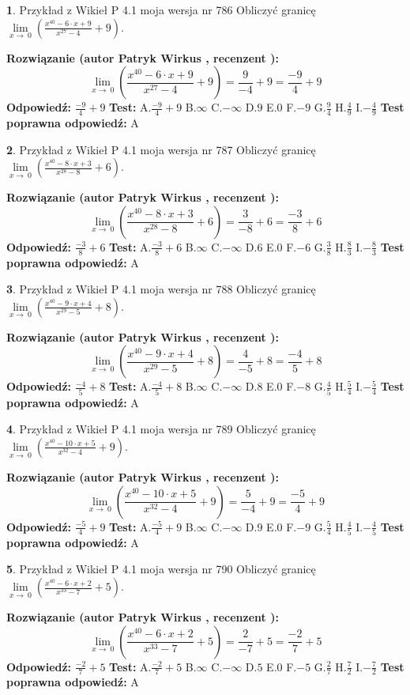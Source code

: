 \documentclass[12pt, a4paper]{article}
\theoremstyle{definition} %
\newtheorem{zad}{}
\newcommand{\zadStart}[1]{\begin{zad}#1\newline}
\newcommand{\zadStop}{\end{zad}}
\newcommand{\rozwStart}[2]{\noindent \textbf{Rozwiązanie (autor #1 , recenzent #2): }\newline}
\newcommand{\rozwStop}{\newline}
\newcommand{\odpStart}{\noindent \textbf{Odpowiedź:}\newline}
\newcommand{\odpStop}{\newline}
\newcommand{\testStart}{\noindent \textbf{Test:}\newline}
\newcommand{\testStop}{\newline}
\newcommand{\kluczStart}{\noindent \textbf{Test poprawna odpowiedź:}\newline}
\newcommand{\kluczStop}{\newline}
\begin{document}
\zadStart{Przykład z Wikieł P 4.1 moja wersja nr 786}
Obliczyć granicę $\lim\limits_{x\to\ 0}(\frac{x^{40}-6 \cdot x +9}{x^{27}-4}+9)$.
\zadStop
\rozwStart{Patryk Wirkus}{}
$$\lim\limits_{x\to\ 0}(\frac{x^{40}-6 \cdot x +9}{x^{27}-4}+9)=\frac{9}{-4}+9=\frac{-9}{4}+9$$
\rozwStop
\odpStart
$\frac{-9}{4}+9$
\odpStop
\testStart
A.$\frac{-9}{4}+9$
B.$\infty$
C.$-\infty$
D.$9$
E.$0$
F.$-9$
G.$\frac{9}{4}$
H.$\frac{4}{9}$
I.$-\frac{4}{9}$
\testStop
\kluczStart
A
\kluczStop



\zadStart{Przykład z Wikieł P 4.1 moja wersja nr 787}
Obliczyć granicę $\lim\limits_{x\to\ 0}(\frac{x^{40}-8 \cdot x +3}{x^{28}-8}+6)$.
\zadStop
\rozwStart{Patryk Wirkus}{}
$$\lim\limits_{x\to\ 0}(\frac{x^{40}-8 \cdot x +3}{x^{28}-8}+6)=\frac{3}{-8}+6=\frac{-3}{8}+6$$
\rozwStop
\odpStart
$\frac{-3}{8}+6$
\odpStop
\testStart
A.$\frac{-3}{8}+6$
B.$\infty$
C.$-\infty$
D.$6$
E.$0$
F.$-6$
G.$\frac{3}{8}$
H.$\frac{8}{3}$
I.$-\frac{8}{3}$
\testStop
\kluczStart
A
\kluczStop



\zadStart{Przykład z Wikieł P 4.1 moja wersja nr 788}
Obliczyć granicę $\lim\limits_{x\to\ 0}(\frac{x^{40}-9 \cdot x +4}{x^{29}-5}+8)$.
\zadStop
\rozwStart{Patryk Wirkus}{}
$$\lim\limits_{x\to\ 0}(\frac{x^{40}-9 \cdot x +4}{x^{29}-5}+8)=\frac{4}{-5}+8=\frac{-4}{5}+8$$
\rozwStop
\odpStart
$\frac{-4}{5}+8$
\odpStop
\testStart
A.$\frac{-4}{5}+8$
B.$\infty$
C.$-\infty$
D.$8$
E.$0$
F.$-8$
G.$\frac{4}{5}$
H.$\frac{5}{4}$
I.$-\frac{5}{4}$
\testStop
\kluczStart
A
\kluczStop



\zadStart{Przykład z Wikieł P 4.1 moja wersja nr 789}
Obliczyć granicę $\lim\limits_{x\to\ 0}(\frac{x^{40}-10 \cdot x +5}{x^{32}-4}+9)$.
\zadStop
\rozwStart{Patryk Wirkus}{}
$$\lim\limits_{x\to\ 0}(\frac{x^{40}-10 \cdot x +5}{x^{32}-4}+9)=\frac{5}{-4}+9=\frac{-5}{4}+9$$
\rozwStop
\odpStart
$\frac{-5}{4}+9$
\odpStop
\testStart
A.$\frac{-5}{4}+9$
B.$\infty$
C.$-\infty$
D.$9$
E.$0$
F.$-9$
G.$\frac{5}{4}$
H.$\frac{4}{5}$
I.$-\frac{4}{5}$
\testStop
\kluczStart
A
\kluczStop



\zadStart{Przykład z Wikieł P 4.1 moja wersja nr 790}
Obliczyć granicę $\lim\limits_{x\to\ 0}(\frac{x^{40}-6 \cdot x +2}{x^{33}-7}+5)$.
\zadStop
\rozwStart{Patryk Wirkus}{}
$$\lim\limits_{x\to\ 0}(\frac{x^{40}-6 \cdot x +2}{x^{33}-7}+5)=\frac{2}{-7}+5=\frac{-2}{7}+5$$
\rozwStop
\odpStart
$\frac{-2}{7}+5$
\odpStop
\testStart
A.$\frac{-2}{7}+5$
B.$\infty$
C.$-\infty$
D.$5$
E.$0$
F.$-5$
G.$\frac{2}{7}$
H.$\frac{7}{2}$
I.$-\frac{7}{2}$
\testStop
\kluczStart
A
\kluczStop
\end{document}
